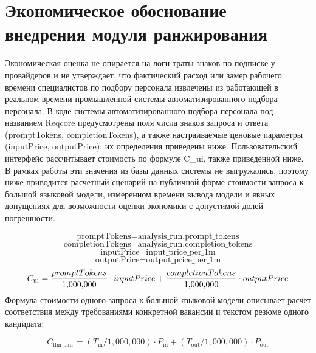 \section{Экономическое обоснование внедрения модуля ранжирования}
Экономическая оценка не опирается на логи траты знаков по подписке у провайдеров и не утверждает, что фактический расход или замер рабочего времени специалистов по подбору персонала извлечены из работающей в реальном времени промышленной системы автоматизированного подбора персонала. В коде системы автоматизированного подбора персонала под названием Reqcore предусмотрены поля числа знаков запроса и ответа (promptTokens, completionTokens), а также настраиваемые ценовые параметры (inputPrice, outputPrice); их определения приведены ниже. Пользовательский интерфейс рассчитывает стоимость по формуле C\_ui, также приведённой ниже. В рамках работы эти значения из базы данных системы не выгружались, поэтому ниже приводится расчетный сценарий на публичной форме стоимости запроса к большой языковой модели, измеренном времени вывода модели и явных допущениях для возможности оценки экономики с допустимой долей погрешности.\par
\begin{equation}
\label{eq:prompttokens-1}
\text{promptTokens} = \text{analysis\_run.prompt\_tokens}
\end{equation}
\begin{equation}
\label{eq:completiontokens-2}
\text{completionTokens} = \text{analysis\_run.completion\_tokens}
\end{equation}
\begin{equation}
\label{eq:inputprice-3}
\text{inputPrice} = \text{input\_price\_per\_1m}
\end{equation}
\begin{equation}
\label{eq:outputprice-4}
\text{outputPrice} = \text{output\_price\_per\_1m}
\end{equation}
\begin{equation}
\label{eq:c_ui-5}
C_{\text{ui}} = \frac{promptTokens}{1{,}000{,}000} \cdot inputPrice \\
         + \frac{completionTokens}{1{,}000{,}000} \cdot outputPrice
\end{equation}
Формула стоимости одного запроса к большой языковой модели описывает расчет соответствия между требованиями конкретной вакансии и текстом резюме одного кандидата:\par
\begin{equation}
\label{eq:c_llm_pair-6}
C_{\text{llm\_pair}} = (T_{\text{in}} / 1{,}000{,}000) \cdot P_{\text{in}} + (T_{\text{out}} / 1{,}000{,}000) \cdot P_{\text{out}}
\end{equation}
